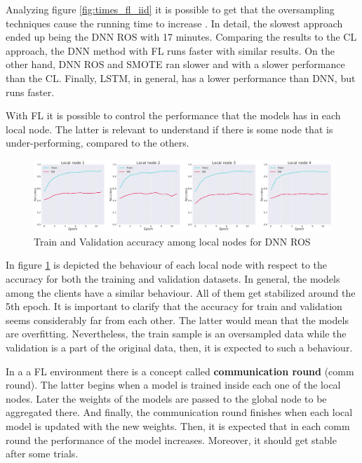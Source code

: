 Analyzing figure \ref{fig:times_fl_iid} it is possible to get that the oversampling techniques cause the running time to increase \cite{fl28}. In detail, the slowest approach ended up being the DNN ROS with 17 minutes. Comparing the results to the CL approach, the DNN method with FL runs faster with similar results. On the other hand, DNN ROS and SMOTE ran slower and with a slower performance than the CL. Finally, LSTM, in general, has a lower performance than DNN, but runs faster.

With FL it is possible to control the performance that the models has in each local node. The latter is relevant to understand if there is some node that is under-performing, compared to the others.

\begin{figure}[H]
\centering
\includegraphics[scale=0.4]{img/iid_local_nodes_acc.png}
\caption{Train and Validation accuracy among local nodes for DNN ROS}
\label{fig:iid_local_nodes_acc}
\end{figure}

In figure \ref{fig:iid_local_nodes_acc} is depicted the behaviour of each local node with respect to the accuracy for both the training and validation datasets. In general, the models among the clients have a similar behaviour. All of them get stabilized around the 5th epoch. It is important to clarify that the accuracy for train and validation seems considerably far from each other. The latter would mean that the models are overfitting. Nevertheless, the train sample is an oversampled data while the validation is a part of the original data, then, it is expected to such a behaviour.

In a a FL environment there is a concept called \textbf{communication round} (comm round). The latter begins when a model is trained inside each one of the local nodes. Later the weights of the models are passed to the global node to be aggregated there. And finally, the communication round finishes when each local model is updated with the new weights. Then, it is expected that in each comm round the performance of the model increases. Moreover, it should get stable after some trials.

